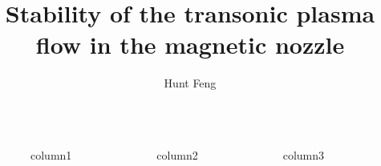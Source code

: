 \documentclass{beamer}
\title{Stability of the transonic plasma flow in the magnetic nozzle}
\author{Hunt Feng}
\institute{University of Saskatchewan}
\newlength{\sepwidth}
\newlength{\colwidth}
\newcommand{\separatorcolumn}{\begin{column}{\sepwidth}\end{column}}
\begin{document}
\begin{frame}
	\begin{columns}
		\separatorcolumn

		\begin{column}{\colwidth}
			column1
		\end{column}

		\separatorcolumn

		\begin{column}{\colwidth}

			column2
		\end{column}

		\separatorcolumn

		\begin{column}{\colwidth}
			column3
		\end{column}

		\separatorcolumn
	\end{columns}
\end{frame}
\end{document}
